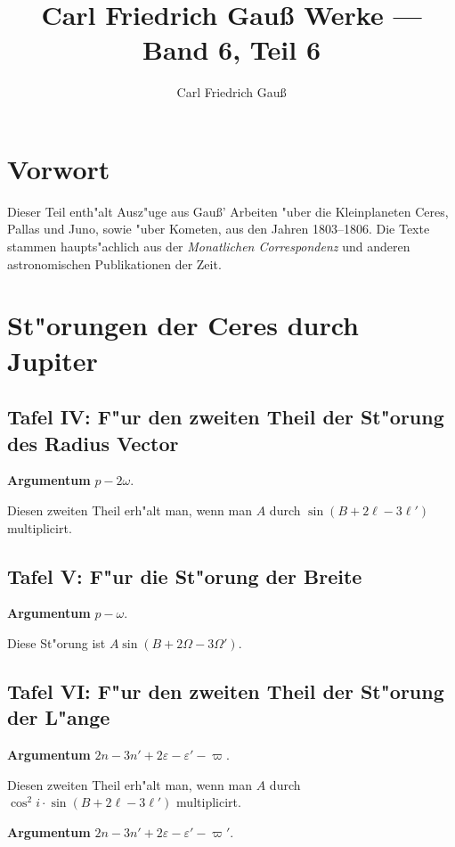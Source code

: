 \documentclass[12pt,a4paper]{article}
\title{Carl Friedrich Gau\ss{} Werke --- Band 6, Teil 6}
\author{Carl Friedrich Gau\ss{}}
\date{}
\begin{document}
\maketitle

\section*{Vorwort}

Dieser Teil enth"alt Ausz"uge aus Gau\ss' Arbeiten "uber die Kleinplaneten Ceres, Pallas und Juno,
sowie "uber Kometen, aus den Jahren 1803--1806. Die Texte stammen haupts"achlich aus der
\textit{Monatlichen Correspondenz} und anderen astronomischen Publikationen der Zeit.

\tableofcontents
\newpage

\section{St"orungen der Ceres durch Jupiter}

\subsection{Tafel IV: F"ur den zweiten Theil der St"orung des Radius Vector}

\textbf{Argumentum} $p - 2\omega$.

Diesen zweiten Theil erh"alt man, wenn man $A$ durch $\sin(B + 2\ell - 3\ell')$ multiplicirt.

\subsection{Tafel V: F"ur die St"orung der Breite}

\textbf{Argumentum} $p - \omega$.

Diese St"orung ist $A \sin(B + 2\Omega - 3\Omega')$.

\subsection{Tafel VI: F"ur den zweiten Theil der St"orung der L"ange}

\textbf{Argumentum} $2n - 3n' + 2\varepsilon - \varepsilon' - \varpi$.

Diesen zweiten Theil erh"alt man, wenn man $A$ durch $\cos^2 i \cdot \sin(B + 2\ell - 3\ell')$ multiplicirt.

\textbf{Argumentum} $2n - 3n' + 2\varepsilon - \varepsilon' - \varpi'$.
\end{document}
